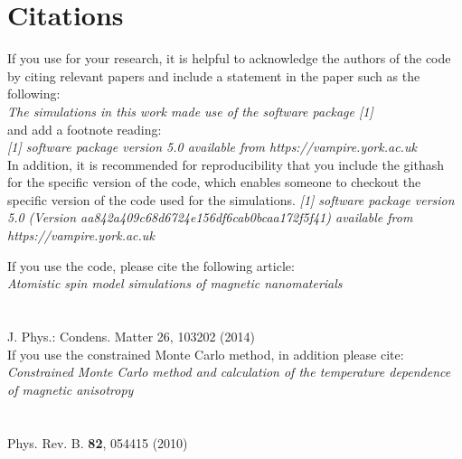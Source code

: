 \section*{Citations}
If you use \vampire for your research, it is helpful to acknowledge the authors of the code by citing relevant papers and include a statement in the paper such as the following:\\
\vspace{0.4cm}
\indent \textit{The simulations in this work made use of the \vampire software package [1]}\\
\vspace{0.2cm}
and add a footnote reading:\\
\vspace{0.2cm}
\indent \textit{[1] \vampire software package version 5.0 available from https://vampire.york.ac.uk}\\
\vspace{0.4cm}
\noindent In addition, it is recommended for reproducibility that you include the githash for the specific version of the code, which enables someone to checkout the specific version of the code used for the simulations. 
\vspace{0.2cm}
\indent \textit{[1] \vampire software package version 5.0 (Version aa842a409c68d6724e156df6cab0bcaa172f5f41) available from https://vampire.york.ac.uk}\\
\vspace{0.4cm}

\noindent If you use the code, please cite the following article:\\
\noindent \textit{\small Atomistic spin model simulations of magnetic nanomaterials}\\
\vspace{-0.4cm}\\
\\
{\small J. Phys.: Condens. Matter 26, 103202 (2014)}\\

\clearpage
\noindent If you use the constrained Monte Carlo method, in addition please cite:\\

\noindent \textit{\small Constrained Monte Carlo method and calculation of the temperature dependence of magnetic anisotropy}\\
\vspace{-0.4cm}\\
\\
{\small Phys. Rev. B. \textbf{82}, 054415 (2010)}\\

